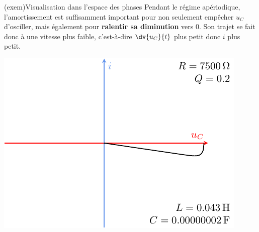 \documentclass[../../main/main.tex]{subfiles}
\begin{document}
\begin{tcb}[sidebyside](exem){Visualisation dans l'espace des phases}
	Pendant le régime apériodique, l'amortissement est suffisamment important pour
	non seulement empêcher $u_C$ d'osciller, mais également pour \textbf{ralentir
		sa diminution }vers $0$. Son trajet se fait donc à une vitesse plus faible,
	c'est-à-dire $\dv{u_C}{t}$ plus petit donc $i$ plus petit.
	\tcblower
	\begin{center}
		\includegraphics[width=\linewidth]{carac-rlc_xy-02}
	\end{center}
\end{tcb}
\end{document}

